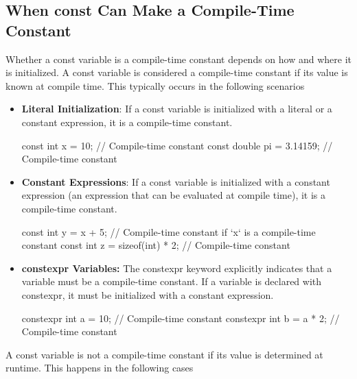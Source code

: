 \documentclass{report}
\begin{document}
\subsection{When const Can Make a Compile-Time Constant}
\bigbreak \noindent 
Whether a const variable is a compile-time constant depends on how and where it is initialized.
\bigbreak \noindent 
A const variable is considered a compile-time constant if its value is known at compile time. This typically occurs in the following scenarios
\begin{itemize}
    \item \textbf{Literal Initialization}: If a const variable is initialized with a literal or a constant expression, it is a compile-time constant.
        \bigbreak \noindent 
        \begin{cppcode}
            const int x = 10;  // Compile-time constant
            const double pi = 3.14159;  // Compile-time constant
        \end{cppcode}
    \item \textbf{Constant Expressions}: If a const variable is initialized with a constant expression (an expression that can be evaluated at compile time), it is a compile-time constant.
        \bigbreak \noindent 
        \begin{cppcode}
            const int y = x + 5;  // Compile-time constant if `x` is a compile-time constant
            const int z = sizeof(int) * 2;  // Compile-time constant
        \end{cppcode}
    \item \textbf{constexpr Variables:} The constexpr keyword explicitly indicates that a variable must be a compile-time constant. If a variable is declared with constexpr, it must be initialized with a constant expression.
        \bigbreak \noindent 
        \begin{cppcode}
            constexpr int a = 10;  // Compile-time constant
            constexpr int b = a * 2;  // Compile-time constant
        \end{cppcode}
\end{itemize}
\bigbreak \noindent 
A const variable is not a compile-time constant if its value is determined at runtime. This happens in the following cases
\end{document}
